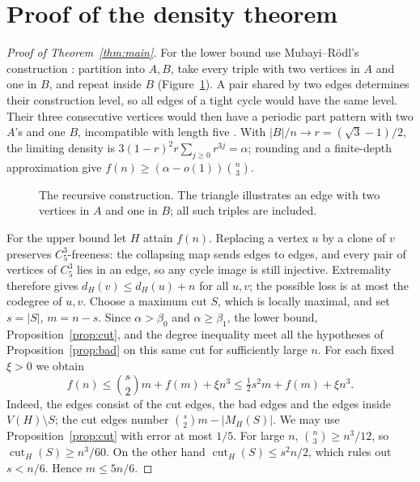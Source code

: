 \documentclass[11pt]{article}
\DeclareMathOperator{\cut}{cut}
\newcommand{\Cfive}{C_5^3}
\begin{document}
\section{Proof of the density theorem}
\begin{proof}[Proof of Theorem~\ref{thm:main}]
For the lower bound use Mubayi--R\"odl's construction
\cite[Construction~1]{MR}: partition into $A,B$, take every triple with
two vertices in $A$ and one in $B$, and repeat inside $B$ (Figure~\ref{fig:construction}).
A pair shared by two edges determines their construction level, so all
edges of a tight cycle would have the same level. Their three consecutive
vertices would then have a periodic part pattern with two $A$'s and one
$B$, incompatible with length five \cite[Example~1.2]{KLP}.
With $|B|/n\to r=(\sqrt3-1)/2$, the limiting density is
$3(1-r)^2r\sum_{j\ge0}r^{3j}=\alpha$; rounding and a finite-depth
approximation give $f(n)\ge(\alpha-o(1))\binom n3$.

\begin{figure}[ht]
\centering
{}
\caption{The recursive construction. The triangle illustrates an edge
with two vertices in $A$ and one in $B$; all such triples are included.}
\label{fig:construction}
\end{figure}

For the upper bound let $H$ attain $f(n)$.
Replacing a vertex $u$ by a clone of $v$ preserves $\Cfive$-freeness:
the collapsing map sends edges to edges, and every pair of vertices of
$\Cfive$ lies in an edge, so any cycle image is still injective.
Extremality therefore gives $d_H(v)\le d_H(u)+n$ for all $u,v$;
the possible loss is at most the codegree of $u,v$.
Choose a maximum cut $S$, which is locally maximal, and set
$s=|S|$, $m=n-s$.
Since $\alpha>\beta_0$ and $\alpha\ge\beta_1$, the lower bound,
Proposition~\ref{prop:cut}, and the degree inequality meet all the
hypotheses of Proposition~\ref{prop:bad} on this same cut for sufficiently
large $n$. For each fixed $\xi>0$ we obtain
\begin{equation}\label{eq:recursion}
 f(n)\le\binom s2m+f(m)+\xi n^3
       \le\tfrac12s^2m+f(m)+\xi n^3.
\end{equation}
Indeed, the edges consist of the cut edges, the bad edges and the edges
inside $V(H)\setminus S$; the cut edges number
$\binom s2m-|M_H(S)|$.
We may use Proposition~\ref{prop:cut} with error at most $1/5$.
For large $n$, $\binom n3\ge n^3/12$, so
$\cut_H(S)\ge n^3/60$. On the other hand
$\cut_H(S)\le s^2n/2$, which rules out $s<n/6$.
Hence $m\le5n/6$.


\end{proof}
\end{document}
